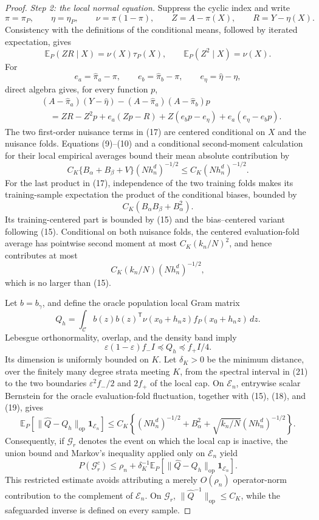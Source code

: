 \documentclass{article}
\begin{document}
\begin{proof}
\emph{Step 2: the local normal equation.}
Suppress the cyclic index and write
\[
\pi=\pi_P,\qquad \eta=\eta_P,\qquad
\nu=\pi(1-\pi),\qquad Z=A-\pi(X),\qquad R=Y-\eta(X).
\]
Consistency with the definitions of the conditional means, followed by iterated expectation, gives
\[
\mathbb E_P(ZR\mid X)=\nu(X)\tau_P(X),
\qquad
\mathbb E_P(Z^2\mid X)=\nu(X).
\tag{16}
\]
For
\[
e_a=\widehat\pi_a-\pi,\qquad
e_b=\widehat\pi_b-\pi,\qquad
e_\eta=\widehat\eta-\eta,
\]
direct algebra gives, for every function \(p\),
\[
\begin{aligned}
&(A-\widehat\pi_a)(Y-\widehat\eta)
-(A-\widehat\pi_a)(A-\widehat\pi_b)p\\
&\quad=ZR-Z^2p
+e_a(Zp-R)+Z(e_bp-e_\eta)+e_a(e_\eta-e_bp).
\end{aligned}
\tag{17}
\]
The two first-order nuisance terms in (17) are centered conditional on \(X\) and the nuisance folds.  Equations (9)--(10) and a conditional second-moment calculation for their local empirical averages bound their mean absolute contribution by
\[
C_K\{B_\alpha+B_\beta+V\}(Nh_n^d)^{-1/2}
\le C_K(Nh_n^d)^{-1/2}.
\tag{18}
\]
For the last product in (17), independence of the two training folds makes its training-sample expectation the product of the conditional biases, bounded by
\[
C_K(B_\alpha B_\beta+B_\alpha^2).
\tag{19}
\]
Its training-centered part is bounded by (15) and the bias--centered variant following (15).  Conditional on both nuisance folds, the centered evaluation-fold average has pointwise second moment at most \(C_K(k_n/N)^2\), and hence contributes at most
\[
C_K(k_n/N)(Nh_n^d)^{-1/2},
\tag{20}
\]
which is no larger than (15).

Let \(b=b_\gamma\), and define the oracle population local Gram matrix
\[
Q_h=\int_{\mathcal C}b(z)b(z)^{\mathsf T}
\nu(x_0+h_nz)f_P(x_0+h_nz)\,dz.
\]
Lebesgue orthonormality, overlap, and the density band imply
\[
\varepsilon(1-\varepsilon)f_-I
\preceq Q_h\preceq f_+I/4.
\tag{21}
\]
Its dimension is uniformly bounded on \(K\).  Let \(\delta_K>0\) be the minimum distance, over the finitely many degree strata meeting \(K\), from the spectral interval in (21) to the two boundaries \(\varepsilon^2f_-/2\) and \(2f_+\) of the local cap.  On \(\mathcal E_n\), entrywise scalar Bernstein for the oracle evaluation-fold fluctuation, together with (15), (18), and (19), gives
\[
\mathbb E_P\!\left[
\lVert\widehat Q-Q_h\rVert_{\mathrm{op}}\mathbf 1_{\mathcal E_n}
\right]
\le C_K\left\{(Nh_n^d)^{-1/2}+B_\alpha^2
+\sqrt{k_n/N}(Nh_n^d)^{-1/2}\right\}.
\tag{22}
\]
Consequently, if \(\mathcal G_r\) denotes the event on which the local cap is inactive, the union bound and Markov's inequality applied only on \(\mathcal E_n\) yield
\[
P(\mathcal G_r^c)
\le \rho_n+\delta_K^{-1}
\mathbb E_P\!\left[
\lVert\widehat Q-Q_h\rVert_{\mathrm{op}}\mathbf 1_{\mathcal E_n}
\right].
\tag{23}
\]
This restricted estimate avoids attributing a merely \(O(\rho_n)\) operator-norm contribution to the complement of \(\mathcal E_n\).  On \(\mathcal G_r\), \(\lVert\widehat Q^{-1}\rVert_{\mathrm{op}}\le C_K\), while the safeguarded inverse is defined on every sample.


\end{proof}
\end{document}
